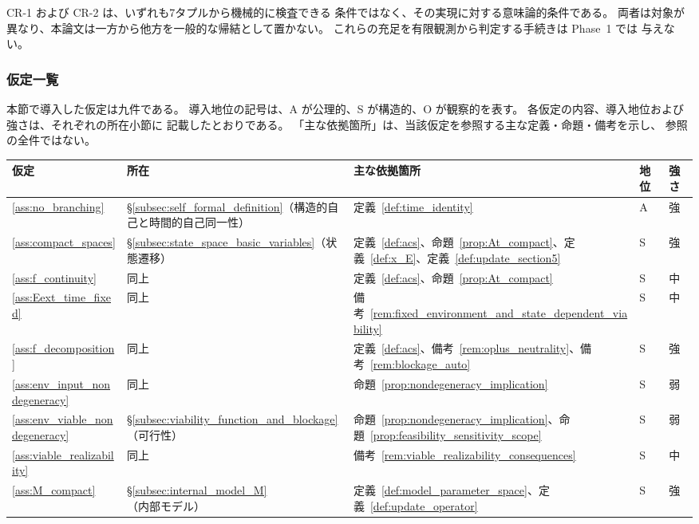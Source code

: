 CR-1 および CR-2 は、いずれも7タプルから機械的に検査できる
条件ではなく、その実現に対する意味論的条件である。
両者は対象が異なり、本論文は一方から他方を一般的な帰結として置かない。
これらの充足を有限観測から判定する手続きは Phase~1 では
与えない。

\subsubsection*{仮定一覧}

本節で導入した仮定は九件である。
導入地位の記号は、A が公理的、S が構造的、O が観察的を表す。
各仮定の内容、導入地位および強さは、それぞれの所在小節に
記載したとおりである。
「主な依拠箇所」は、当該仮定を参照する主な定義・命題・備考を示し、
参照の全件ではない。

\medskip
{\small
\begin{center}
\begin{tabular}{p{1.4cm} p{4.0cm} p{6.0cm} p{0.8cm} p{0.8cm}}
\hline
\textbf{仮定} & \textbf{所在} & \textbf{主な依拠箇所} & \textbf{地位} & \textbf{強さ} \\
\hline
\ref{ass:no_branching} & \S\ref{subsec:self_formal_definition}（構造的自己と時間的自己同一性） & 定義~\ref{def:time_identity} & A & 強 \\[2pt]
\ref{ass:compact_spaces} & \S\ref{subsec:state_space_basic_variables}（状態遷移） & 定義~\ref{def:acs}、命題~\ref{prop:At_compact}、定義~\ref{def:x_E}、定義~\ref{def:update_section5} & S & 強 \\[2pt]
\ref{ass:f_continuity} & 同上 & 定義~\ref{def:acs}、命題~\ref{prop:At_compact} & S & 中 \\[2pt]
\ref{ass:Eext_time_fixed} & 同上 & 備考~\ref{rem:fixed_environment_and_state_dependent_viability} & S & 中 \\[2pt]
\ref{ass:f_decomposition} & 同上 & 定義~\ref{def:acs}、備考~\ref{rem:oplus_neutrality}、備考~\ref{rem:blockage_auto} & S & 強 \\[2pt]
\ref{ass:env_input_nondegeneracy} & 同上 & 命題~\ref{prop:nondegeneracy_implication} & S & 弱 \\[2pt]
\ref{ass:env_viable_nondegeneracy} & \S\ref{subsec:viability_function_and_blockage}（可行性） & 命題~\ref{prop:nondegeneracy_implication}、命題~\ref{prop:feasibility_sensitivity_scope} & S & 弱 \\[2pt]
\ref{ass:viable_realizability} & 同上 & 備考~\ref{rem:viable_realizability_consequences} & S & 中 \\[2pt]
\ref{ass:M_compact} & \S\ref{subsec:internal_model_M}（内部モデル） & 定義~\ref{def:model_parameter_space}、定義~\ref{def:update_operator} & S & 強 \\
\hline
\end{tabular}
\end{center}
}

